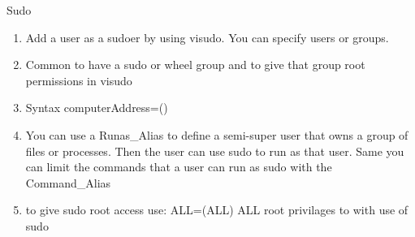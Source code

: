 \documentclass{notes}
\begin{document}
\begin{questions}{Sudo}
	\begin{enumerate}
		\item Add a user as a sudoer by using visudo. You can specify users or groups.
		\item Common to have a sudo or wheel group and to give that group root permissions in visudo
		\item Syntax \ra {} computerAddress=() 
		\item You can use a Runas\_Alias to define a semi-super user that owns a group of files or processes. Then the user can use sudo to run as that user. Same you can limit the commands that a user can run as sudo  with the Command\_Alias
		\item to give sudo root access use:  ALL=(ALL) ALL \ra root privilages to  with use of sudo
	\end{enumerate}
\end{questions}
\end{document}

